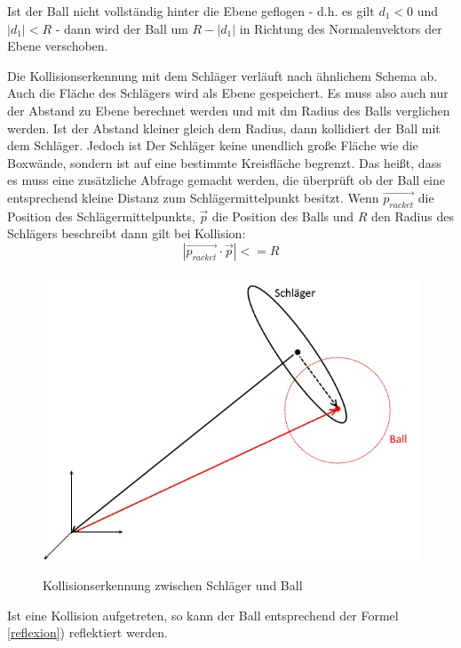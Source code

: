 Ist der Ball nicht vollständig hinter die Ebene geflogen - d.h. es gilt $d_1<0$ und $|d_1|<R $ - dann wird der Ball um $R - |d_1|$ in Richtung des Normalenvektors der Ebene verschoben.

Die Kollisionserkennung mit dem Schläger verläuft nach ähnlichem Schema ab. Auch die Fläche des Schlägers wird als Ebene gespeichert. Es muss also auch nur der Abstand zu Ebene berechnet werden und mit dm Radius des Balls verglichen werden. Ist der Abstand kleiner gleich dem Radius, dann kollidiert der Ball mit dem Schläger. Jedoch ist Der Schläger keine unendlich große Fläche wie die  Boxwände, sondern ist auf eine bestimmte Kreisfläche begrenzt. Das heißt, dass es muss eine zusätzliche Abfrage gemacht werden, die überprüft ob der Ball eine entsprechend kleine Distanz zum Schlägermittelpunkt besitzt.
Wenn $\vec{p_{racket}}$ die Position des Schlägermittelpunkts, $\vec{p}$ die Position des Balls und $R$ den Radius des Schlägers beschreibt dann gilt bei Kollision:
\begin{equation}
	|\vec{p_{racket}}\cdot\vec{p}| <= R
\end{equation}

\begin{figure}[h]
   \begin{center}
    \includegraphics[scale=0.4]{bilder/collisionRacket}\label{fig_colRacket}
   \end{center} 
    \caption{Kollisionserkennung zwischen Schläger und Ball}
        \label{fig_colRacket2}
\end{figure} 

Ist eine Kollision aufgetreten, so kann der Ball entsprechend der Formel \ref{reflexion}) reflektiert werden.

